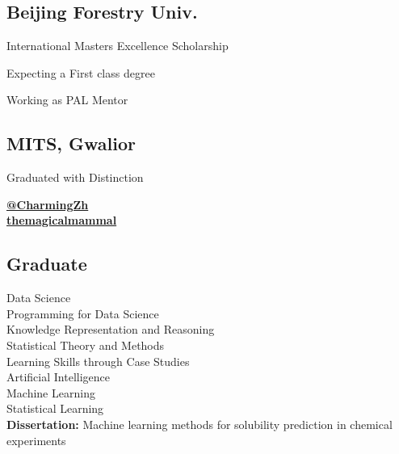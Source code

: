 \documentclass[a4paper]{MagicalCV}
\begin{document}
\lastupdated


\begin{minipage}[t]{0.33\textwidth} 


\subsection{Beijing Forestry Univ.}
\vspace{\topsep} %
\begin{tightemize}
\item International Masters Excellence Scholarship
\item Expecting a First class degree
\item Working as PAL Mentor
\end{tightemize}
\sectionsep

\subsection{MITS, Gwalior}
Graduated with Distinction
\sectionsep


    \href{https://github.com/CharmingZh}
         {\bf @CharmingZh} \\
    \href{https://www.linkedin.com/in/themagicalmammal/}
         {\bf themagicalmammal}
\sectionsep


\subsection{Graduate}
Data Science \\
Programming for Data Science \\
Knowledge Representation and Reasoning \\
Statistical Theory and Methods \\
Learning Skills through Case Studies \\
Artificial Intelligence \\
Machine Learning \\
Statistical Learning \\ 
\textbf{Dissertation: }
Machine learning methods for solubility prediction in chemical experiments
\sectionsep


\end{minipage}
\end{document}
